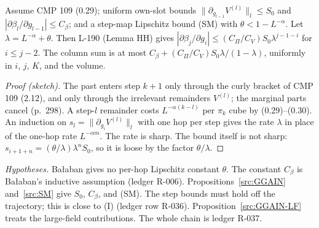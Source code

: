 \begin{proposition}\label{src:HHIST}
Assume CMP 109 (0.29); uniform own-slot bounds $\|\partial_{g_{l-1}}V^{(l)}\|_l\le S_0$ and $|\partial\beta_l/\partial g_{l-1}|\le C_\beta$; and a step-map Lipschitz bound (SM) with $\theta<1-L^{-\alpha}$. Let $\lambda=L^{-\alpha}+\theta$. Then L-190 (Lemma HH) gives $|\partial\beta_j/\partial g_i|\le(C_\Pi/C_V)S_0\lambda^{j-1-i}$ for $i\le j-2$. The column sum is at most $C_\beta+(C_\Pi/C_V)S_0\lambda/(1-\lambda)$, uniformly in $i$, $j$, $K$, and the volume.
\end{proposition}
\begin{proof}[Proof (sketch)]
The past enters step $k+1$ only through the curly bracket of CMP 109 (2.12), and only through the irrelevant remainders $V^{(l)}$; the marginal parts cancel (p.~298). A step-$l$ remainder costs $L^{-\alpha(k-l)}$ per $\pi_k$ cube by (0.29)--(0.30). An induction on $s_l=\|\partial_{g_i}V^{(l)}\|_l$ with one hop per step gives the rate $\lambda$ in place of the one-hop rate $L^{-\alpha m}$. The rate is sharp. The bound itself is not sharp: $s_{i+1+n}=(\theta/\lambda)\lambda^nS_0$, so it is loose by the factor $\theta/\lambda$.
\end{proof}
\emph{Hypotheses.} Ba{\l}aban gives no per-hop Lipschitz constant $\theta$. The constant $C_\beta$ is Ba{\l}aban's inductive assumption (ledger R-006). Propositions~\ref{src:GGAIN} and~\ref{src:SM} give $S_0$, $C_\beta$, and (SM). The step bounds must hold off the trajectory; this is close to (I) (ledger row R-036). Proposition~\ref{src:GGAIN-LF} treats the large-field contributions. The whole chain is ledger R-037.

